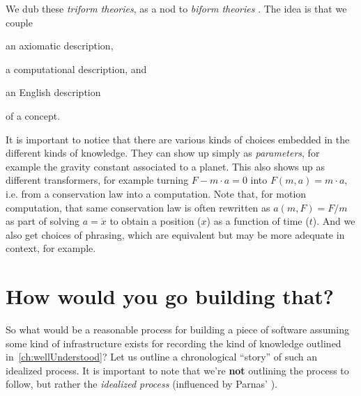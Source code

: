 \documentclass[sigconf,review]{acmart}
\begin{document}
We dub these \emph{triform theories}, as a nod to \emph{biform theories}%
\cite{Farmer}. The idea is that we couple 
\begin{enumerate*}
\item an axiomatic description,
\item a computational description, and
\item an English description
\end{enumerate*}
of a concept.

It is important to notice that there are various kinds of choices
embedded in the different kinds of knowledge. They can show up simply as
\emph{parameters}, for example the gravity constant associated to a planet.
This also shows up as different transformers, for example turning
$F - m\cdot a = 0$ into $F\left(m, a\right) = m\cdot a$, i.e. from a 
conservation law into a computation. Note that, for motion computation, that
same conservation law is often rewritten as $a\left(m,F\right) = F/m$ as
part of solving $a = \ddot{x}$ to obtain a position ($x$) as a function of time ($t$).
And we also get choices of phrasing, which are equivalent but may be more
adequate in context, for example.

\section{How would you go building that?}\label{ch:process}

So what would be a reasonable process for building a piece of software
assuming some kind of infrastructure exists for recording the kind of
knowledge outlined in~\autoref{ch:wellUnderstood}? Let us outline a
chronological ``story'' of such an idealized process.  It is important to
note that we're \textbf{not} outlining the process to follow, but rather
the \emph{idealized process} (influenced by Parnas' \cite{Parnas1986}).
\end{document}
